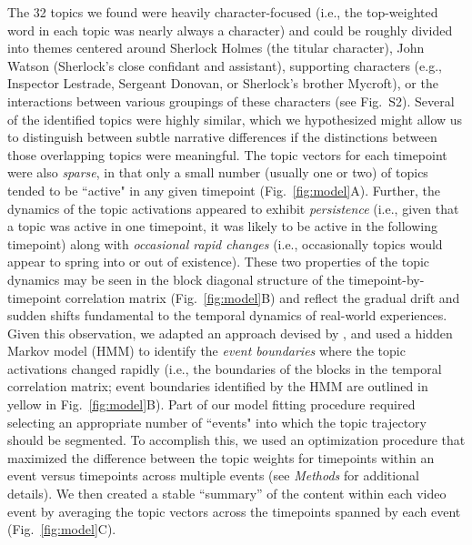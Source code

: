 \documentclass{article}
\newcommand{\topics}{S2}
\begin{document}
The 32 topics we found were heavily character-focused (i.e., the top-weighted word in each topic was nearly always a character) and could be roughly divided into themes centered around Sherlock Holmes (the titular character), John Watson (Sherlock's close confidant and assistant), supporting characters (e.g., Inspector Lestrade, Sergeant Donovan, or Sherlock's brother Mycroft), or the interactions between various groupings of these characters (see Fig.~\topics).  Several of the identified topics were highly similar, which we hypothesized might allow us to distinguish between subtle narrative differences if the distinctions between those overlapping topics were meaningful.  The topic vectors for each timepoint were also \textit{sparse}, in that only a small number (usually one or two) of topics tended to be ``active" in any given timepoint (Fig.~\ref{fig:model}A).  Further, the dynamics of the topic activations appeared to exhibit \textit{persistence} (i.e., given that a topic was active in one timepoint, it was likely to be active in the following timepoint) along with \textit{occasional rapid changes} (i.e., occasionally topics would appear to spring into or out of existence).  These two properties of the topic dynamics may be seen in the block diagonal structure of the timepoint-by-timepoint correlation matrix (Fig.~\ref{fig:model}B) and reflect the gradual drift and sudden shifts fundamental to the temporal dynamics of real-world experiences.  Given this observation, we adapted an approach devised by \cite{BaldEtal17}, and used a hidden Markov model (HMM) to identify the \textit{event boundaries} where the topic activations changed rapidly (i.e., the boundaries of the blocks in the temporal correlation matrix; event boundaries identified by the HMM are outlined in yellow in Fig.~\ref{fig:model}B).  Part of our model fitting procedure required selecting an appropriate number of ``events" into which the topic trajectory should be segmented.  To accomplish this, we used an optimization procedure that maximized the difference between the topic weights for timepoints within an event versus timepoints across multiple events (see \textit{Methods} for additional details).  We then created a stable ``summary'' of the content within each video event by averaging the topic vectors across the timepoints spanned by each event (Fig.~\ref{fig:model}C).
\end{document}

